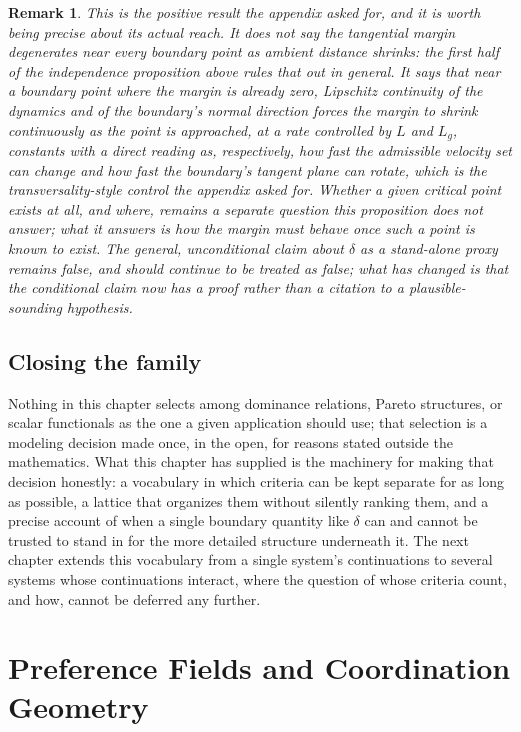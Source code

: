 \documentclass[11pt]{report}
\newtheorem{remark}{Remark}[chapter]
\begin{document}
\begin{remark}
This is the positive result the appendix asked for, and it is worth
being precise about its actual reach. It does not say the tangential
margin degenerates near \emph{every} boundary point as ambient distance
shrinks: the first half of the independence proposition above rules
that out in general. It says that near a boundary point where the
margin is \emph{already zero}, Lipschitz continuity of the
dynamics and of the boundary's normal direction forces the margin to
shrink continuously as the point is approached, at a rate controlled
by $L$ and $L_g$, constants with a direct reading as, respectively,
how fast the admissible velocity set can change and how fast the
boundary's tangent plane can rotate, which is the
transversality-style control the appendix asked for. Whether a given
critical point exists at all, and where, remains a separate question
this proposition does not answer; what it answers is how the margin
must behave once such a point is known to exist. The general,
unconditional claim about $\delta$ as a stand-alone proxy remains
false, and should continue to be treated as false; what has changed is
that the conditional claim now has a proof rather than a citation to a
plausible-sounding hypothesis.
\end{remark}

\section*{Closing the family}

Nothing in this chapter selects among dominance relations, Pareto
structures, or scalar functionals as the one a given application
should use; that selection is a modeling decision made once, in the
open, for reasons stated outside the mathematics. What this chapter
has supplied is the machinery for making that decision honestly:
a vocabulary in which criteria can be kept separate for as long as
possible, a lattice that organizes them without silently ranking them,
and a precise account of when a single boundary quantity like $\delta$
can and cannot be trusted to stand in for the more detailed structure
underneath it. The next chapter extends this vocabulary from a single
system's continuations to several systems whose continuations
interact, where the question of whose criteria count, and how, cannot
be deferred any further.

\chapter{Preference Fields and Coordination Geometry}
\end{document}
